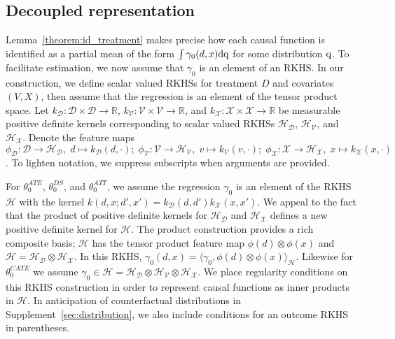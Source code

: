 \subsection{Decoupled representation}

Lemma~\ref{theorem:id_treatment} makes precise how each causal function is identified as a partial mean of the form $\int \gamma_0(d,x)\mathrm{d}\text{\normalfont q}$ for some distribution $\text{\normalfont q}$. To facilitate estimation, we now assume that $\gamma_0$ is an element of an RKHS. %
In our construction, we define scalar valued RKHSs for treatment $D$ and covariates $(V,X)$, then assume that the regression is an element of the tensor product space. Let $k_{\mathcal{D}}:\mathcal{D}\times \mathcal{D}\rightarrow \mathbb{R}$, $k_{\mathcal{V}}:\mathcal{V}\times \mathcal{V}\rightarrow \mathbb{R}$, and $k_{\mathcal{X}}:\mathcal{X}\times \mathcal{X}\rightarrow \mathbb{R}$ be measurable positive definite kernels corresponding to scalar valued RKHSs $\mathcal{H}_{\mathcal{D}}$, $\mathcal{H}_{\mathcal{V}}$, and $\mathcal{H}_{\mathcal{X}}$. Denote the feature maps
$
\phi_{\mathcal{D}}:\mathcal{D}\rightarrow \mathcal{H}_{\mathcal{D}}, \; d\mapsto k_{\mathcal{D}}(d,\cdot ); \;
\phi_{\mathcal{V}}:\mathcal{V}\rightarrow \mathcal{H}_{\mathcal{V}}, \; v\mapsto k_{\mathcal{V}}(v,\cdot );
 \; \phi_{\mathcal{X}}:\mathcal{X}\rightarrow \mathcal{H}_{\mathcal{X}}, \; x\mapsto k_{\mathcal{X}}(x,\cdot )
$.
To lighten notation, we suppress subscripts when arguments are provided. %

For $\theta_0^{ATE}$, $\theta_0^{DS}$, and $\theta_0^{ATT}$, we assume the regression $\gamma_0$ is an element of the RKHS $\mathcal{H}$ with the kernel $k(d,x;d',x')=k_{\mathcal{D}}(d,d')k_{\mathcal{X}}(x,x')$. We appeal to the fact that the product of positive definite kernels for $\mathcal{H}_{\mathcal{D}}$ and $\mathcal{H}_{\mathcal{X}}$ defines a new positive definite kernel for $\mathcal{H}$. The product construction provides a rich composite basis; $\mathcal{H}$ has the tensor product feature map $\phi(d)\otimes \phi(x)$ and $\mathcal{H}=\mathcal{H}_{\mathcal{D}}\otimes \mathcal{H}_{\mathcal{X}}$. In this RKHS,
$
\gamma_0(d,x)=\langle \gamma_0, \phi(d)\otimes \phi(x)\rangle_{\mathcal{H}} 
$.
Likewise for $\theta_0^{CATE}$ we assume $\gamma_0\in \mathcal{H}=\mathcal{H}_{\mathcal{D}}\otimes\mathcal{H}_{\mathcal{V}}\otimes  \mathcal{H}_{\mathcal{X}}$. We place regularity conditions on this RKHS construction in order to represent causal functions as inner products in $\mathcal{H}$. In anticipation of counterfactual distributions in Supplement~\ref{sec:distribution}, we also include conditions for an outcome RKHS in parentheses.

